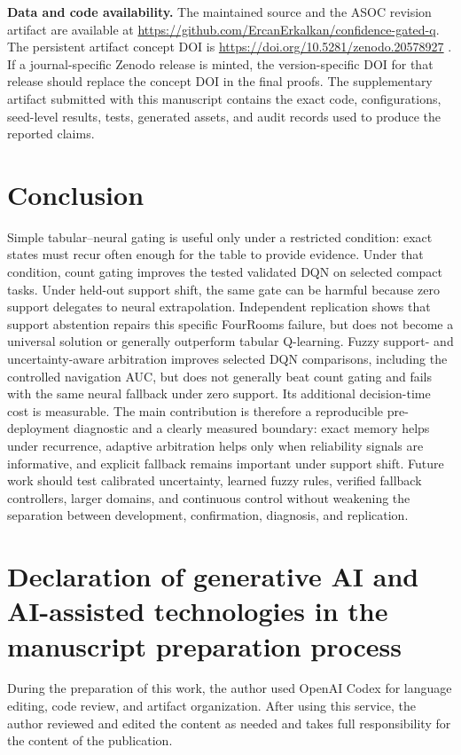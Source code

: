 \documentclass[preprint,12pt]{elsarticle}
\begin{document}
\begingroup
\sloppy
\textbf{Data and code availability.} The maintained source and the ASOC revision
artifact are available at
\url{https://github.com/ErcanErkalkan/confidence-gated-q}. The persistent
artifact concept DOI is \url{https://doi.org/10.5281/zenodo.20578927}
\cite{erkalkan2026artifact}. If a journal-specific Zenodo release is minted,
the version-specific DOI for that release should replace the concept DOI in the
final proofs. The supplementary artifact submitted with this manuscript contains
the exact code, configurations, seed-level results, tests, generated assets, and
audit records used to produce the reported claims.
\endgroup

\section{Conclusion}
\label{sec:conclusion}

Simple tabular--neural gating is useful only under a restricted condition:
exact states must recur often enough for the table to provide evidence. Under
that condition, count gating improves the tested validated DQN on selected
compact tasks. Under held-out support shift, the same gate can be harmful
because zero support delegates to neural extrapolation. Independent
replication shows that support abstention repairs this specific FourRooms
failure, but does not become a universal solution or generally outperform
tabular Q-learning. Fuzzy support- and uncertainty-aware arbitration improves
selected DQN comparisons, including the controlled navigation AUC, but does
not generally beat count gating and fails with the same neural fallback under
zero support. Its additional decision-time cost is measurable. The main
contribution is therefore a reproducible pre-deployment diagnostic and a
clearly measured boundary: exact memory helps under recurrence, adaptive
arbitration helps only when reliability signals are informative, and explicit
fallback remains important under support shift. Future work should test
calibrated uncertainty, learned fuzzy rules, verified fallback controllers,
larger domains, and continuous control without weakening the separation
between development, confirmation, diagnosis, and replication.

\FloatBarrier
\section*{Declaration of generative AI and AI-assisted technologies in the
manuscript preparation process}

During the preparation of this work, the author used OpenAI Codex for language
editing, code review, and artifact organization. After using this service, the
author reviewed and edited the content as needed and takes full responsibility
for the content of the publication.



\end{document}
